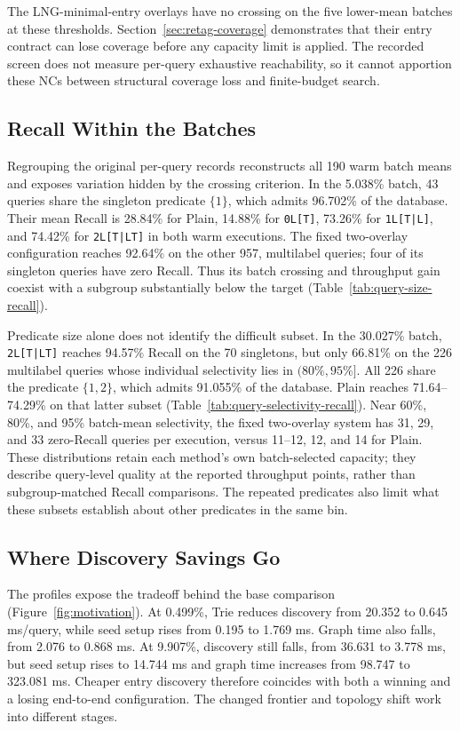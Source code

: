 The LNG-minimal-entry overlays have no crossing on the five lower-mean
batches at these thresholds. Section~\ref{sec:retag-coverage} demonstrates
that their entry contract can lose coverage before any capacity limit is
applied. The recorded screen does not measure per-query exhaustive
reachability, so it cannot apportion these NCs between structural coverage
loss and finite-budget search.

\subsection{Recall Within the Batches}
Regrouping the original per-query records reconstructs all 190 warm batch
means and exposes variation hidden by the crossing criterion. In the
5.038\% batch, 43 queries share the singleton predicate $\{1\}$, which
admits 96.702\% of the database.
Their mean Recall is 28.84\% for Plain, 14.88\% for \texttt{0L[T]},
73.26\% for \texttt{1L[T|L]}, and 74.42\% for \texttt{2L[T|LT]} in both
warm executions. The fixed two-overlay configuration reaches 92.64\%
on the other 957, multilabel queries; four of its singleton queries have
zero Recall. Thus its batch crossing and throughput gain coexist with a
subgroup substantially below the target (Table~\ref{tab:query-size-recall}).

Predicate size alone does not identify the difficult subset. In the
30.027\% batch, \texttt{2L[T|LT]} reaches 94.57\% Recall on the 70
singletons, but only 66.81\% on the 226 multilabel queries whose individual
selectivity lies in $(80\%,95\%]$. All 226 share the predicate $\{1,2\}$,
which admits 91.055\% of the database. Plain reaches 71.64--74.29\% on that
latter subset (Table~\ref{tab:query-selectivity-recall}). Near 60\%, 80\%,
and 95\% batch-mean selectivity, the fixed two-overlay system has 31, 29,
and 33 zero-Recall queries per execution, versus 11--12, 12, and 14 for
Plain. These distributions retain each method's own batch-selected capacity;
they describe query-level quality at the reported throughput points, rather
than subgroup-matched Recall comparisons. The repeated predicates also
limit what these subsets establish about other predicates in the same bin.

\subsection{Where Discovery Savings Go}
\authoritativeAmazonSummary
The profiles expose the tradeoff behind the base comparison
(Figure~\ref{fig:motivation}). At 0.499\%, Trie reduces discovery from
20.352 to 0.645 ms/query, while seed setup rises from 0.195 to 1.769 ms.
Graph time also falls, from 2.076 to 0.868 ms. At 9.907\%, discovery still
falls, from 36.631 to 3.778 ms, but seed setup rises to 14.744 ms and graph
time increases from 98.747 to 323.081 ms. Cheaper entry discovery therefore
coincides with both a winning and a losing end-to-end configuration.
The changed frontier and topology shift work into different stages.

